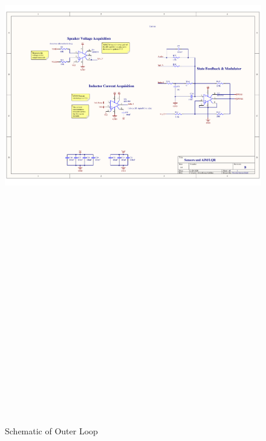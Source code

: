 \clearpage
\begin{landscape}
	\begin{figure}[hbtp]
		\centering
		\includegraphics[width=20cm,height=28.7cm,keepaspectratio]{0_Figures/Appendix/OuterLoop_Schematic.pdf}
		\caption{Schematic of Outer Loop \cite{multivar_ctrl_loops_for_SM_audio_systems}}
		\label{fig:schematic_outerloop}
	\end{figure}
\end{landscape}

